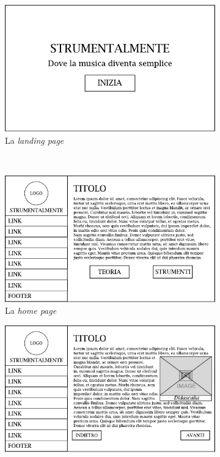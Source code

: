 \begin{figure}[H]
	\centering
	\begin{subfigure}[t]{0.5\textwidth}
		\centering
		\includegraphics[width=\textwidth]{gabbie_logiche/Landing_Page}
		\caption{La \emph{landing page}}
	\end{subfigure}%
	~ 
	\begin{subfigure}[t]{0.5\textwidth}
		\centering
		\includegraphics[width=\textwidth]{gabbie_logiche/Home}
		\caption{La \emph{home page}}
	\end{subfigure}
	\begin{subfigure}[t]{0.5\textwidth}
		\centering
		\includegraphics[width=\textwidth]{gabbie_logiche/Contenuto_Generico}

\end{subfigure}
\end{figure}
